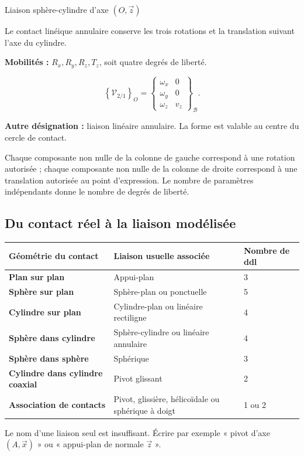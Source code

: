 \begin{TLLiaisonCard}{Liaison sphère-cylindre d'axe \((O,\vec z)\)}
\begin{minipage}[c]{.18\linewidth}\centering
\TLSymSphereCylindre
\end{minipage}\hfill
\begin{minipage}[c]{.77\linewidth}
Le contact linéique annulaire conserve les trois rotations et la translation
suivant l'axe du cylindre.

\textbf{Mobilités :} \(R_x,R_y,R_z,T_z\), soit quatre degrés de liberté.

\[
\left\{\mathcal V_{2/1}\right\}_O=
\left\{\begin{array}{cc}
\omega_x&0\\\omega_y&0\\\omega_z&v_z
\end{array}\right\}_{\mathcal B}.
\]

\textbf{Autre désignation :} liaison linéaire annulaire. La forme est valable
au centre du cercle de contact.
\end{minipage}
\end{TLLiaisonCard}

\begin{TLRemark}
Chaque composante non nulle de la colonne de gauche correspond à une rotation
autorisée ; chaque composante non nulle de la colonne de droite correspond à
une translation autorisée au point d'expression. Le nombre de paramètres
indépendants donne le nombre de degrés de liberté.
\end{TLRemark}

\subsection{Du contact réel à la liaison modélisée}

\begin{center}
\renewcommand{\arraystretch}{1.25}
\begin{tabularx}{\linewidth}{|>{\bfseries}p{.27\linewidth}|X|p{.22\linewidth}|}
\hline
\rowcolor{TLTableHeader}
Géométrie du contact & Liaison usuelle associée & Nombre de ddl\\ \hline
Plan sur plan & Appui-plan & 3\\ \hline
Sphère sur plan & Sphère-plan ou ponctuelle & 5\\ \hline
Cylindre sur plan & Cylindre-plan ou linéaire rectiligne & 4\\ \hline
Sphère dans cylindre & Sphère-cylindre ou linéaire annulaire & 4\\ \hline
Sphère dans sphère & Sphérique & 3\\ \hline
Cylindre dans cylindre coaxial & Pivot glissant & 2\\ \hline
Association de contacts & Pivot, glissière, hélicoïdale ou sphérique à doigt & 1 ou 2\\ \hline
\end{tabularx}
\end{center}

\begin{TLQuoteBox}
Le nom d'une liaison seul est insuffisant. Écrire par exemple
« pivot d'axe \((A,\vec x)\) » ou « appui-plan de normale \(\vec z\) ».
\end{TLQuoteBox}
